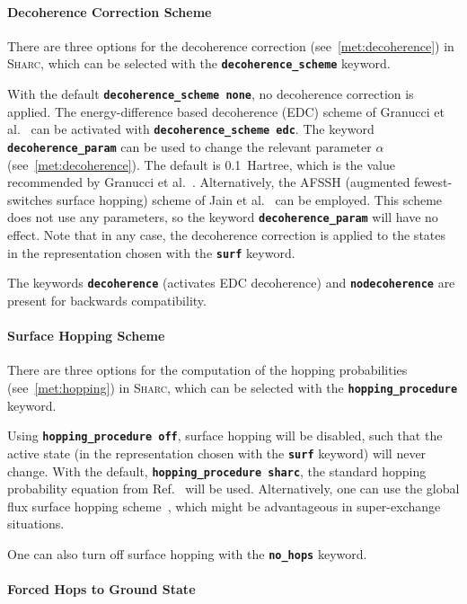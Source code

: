 \documentclass[a4paper,10pt,DIV=15,openany]{scrbook}
\newcommand{\sharc}{\textsc{Sharc}}
\newcommand{\ttt}[1]{\textbf{\texttt{#1}}}
\begin{document}
\paragraph{Decoherence Correction Scheme}

There are three options for the decoherence correction (see~\ref{met:decoherence}) in \sharc, which can be selected with the \ttt{decoherence\_scheme} keyword. 

With the default \ttt{decoherence\_scheme none}, no decoherence correction is applied.
The energy-difference based decoherence (EDC) scheme of Granucci et al.~\cite{Granucci2010JCP} can be activated with \ttt{decoherence\_scheme edc}. 
The keyword \ttt{decoherence\_param} can be used to change the relevant parameter $\alpha$ (see~\ref{met:decoherence}). The default is 0.1~Hartree, which is the value recommended by Granucci et al.~\cite{Granucci2010JCP}.
Alternatively, the AFSSH (augmented fewest-switches surface hopping) scheme of Jain et al.~\cite{Jain2016JCTC} can be employed. This scheme does not use any parameters, so the keyword \ttt{decoherence\_param} will have no effect.
Note that in any case, the decoherence correction is applied to the states in the representation chosen with the \ttt{surf} keyword.

The keywords \ttt{decoherence} (activates EDC decoherence) and \ttt{nodecoherence} are present for backwards compatibility.

\paragraph{Surface Hopping Scheme}

There are three options for the computation of the hopping probabilities (see~\ref{met:hopping}) in \sharc, which can be selected with the \ttt{hopping\_procedure} keyword. 

Using \ttt{hopping\_procedure off}, surface hopping will be disabled, such that the active state (in the representation chosen with the \ttt{surf} keyword) will never change.
With the default, \ttt{hopping\_procedure sharc}, the standard hopping probability equation from Ref.~\cite{Mai2015IJQC} will be used.
Alternatively, one can use the global flux surface hopping scheme~\cite{Wang2014JCTC}, which might be advantageous in super-exchange situations.

One can also turn off surface hopping with the \ttt{no\_hops} keyword.

\paragraph{Forced Hops to Ground State}
\end{document}
